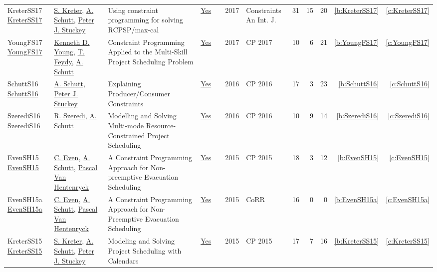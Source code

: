{\begin{longtable}{>{\raggedright\arraybackslash}p{3cm}>{\raggedright\arraybackslash}p{6cm}>{\raggedright\arraybackslash}p{6.5cm}rrrp{2.5cm}rrrrr}
KreterSS17 \href{https://doi.org/10.1007/s10601-016-9266-6}{KreterSS17} & \hyperref[auth:a124]{S. Kreter}, \hyperref[auth:a125]{A. Schutt}, \hyperref[auth:a126]{Peter J. Stuckey} & Using constraint programming for solving RCPSP/max-cal & \href{works/KreterSS17.pdf}{Yes} & \cite{KreterSS17} & 2017 & Constraints An Int. J. & 31 & 15 & 20 & \ref{b:KreterSS17} & \ref{c:KreterSS17}\\
YoungFS17 \href{https://doi.org/10.1007/978-3-319-66158-2\_20}{YoungFS17} & \hyperref[auth:a194]{Kenneth D. Young}, \hyperref[auth:a155]{T. Feydy}, \hyperref[auth:a125]{A. Schutt} & Constraint Programming Applied to the Multi-Skill Project Scheduling Problem & \href{works/YoungFS17.pdf}{Yes} & \cite{YoungFS17} & 2017 & CP 2017 & 10 & 6 & 21 & \ref{b:YoungFS17} & \ref{c:YoungFS17}\\
SchuttS16 \href{https://doi.org/10.1007/978-3-319-44953-1\_28}{SchuttS16} & \hyperref[auth:a125]{A. Schutt}, \hyperref[auth:a126]{Peter J. Stuckey} & Explaining Producer/Consumer Constraints & \href{works/SchuttS16.pdf}{Yes} & \cite{SchuttS16} & 2016 & CP 2016 & 17 & 3 & 23 & \ref{b:SchuttS16} & \ref{c:SchuttS16}\\
SzerediS16 \href{https://doi.org/10.1007/978-3-319-44953-1\_31}{SzerediS16} & \hyperref[auth:a206]{R. Szeredi}, \hyperref[auth:a125]{A. Schutt} & Modelling and Solving Multi-mode Resource-Constrained Project Scheduling & \href{works/SzerediS16.pdf}{Yes} & \cite{SzerediS16} & 2016 & CP 2016 & 10 & 9 & 14 & \ref{b:SzerediS16} & \ref{c:SzerediS16}\\
EvenSH15 \href{https://doi.org/10.1007/978-3-319-23219-5\_40}{EvenSH15} & \hyperref[auth:a220]{C. Even}, \hyperref[auth:a125]{A. Schutt}, \hyperref[auth:a149]{Pascal Van Hentenryck} & A Constraint Programming Approach for Non-preemptive Evacuation Scheduling & \href{works/EvenSH15.pdf}{Yes} & \cite{EvenSH15} & 2015 & CP 2015 & 18 & 3 & 12 & \ref{b:EvenSH15} & \ref{c:EvenSH15}\\
EvenSH15a \href{http://arxiv.org/abs/1505.02487}{EvenSH15a} & \hyperref[auth:a220]{C. Even}, \hyperref[auth:a125]{A. Schutt}, \hyperref[auth:a149]{Pascal Van Hentenryck} & A Constraint Programming Approach for Non-Preemptive Evacuation Scheduling & \href{works/EvenSH15a.pdf}{Yes} & \cite{EvenSH15a} & 2015 & CoRR & 16 & 0 & 0 & \ref{b:EvenSH15a} & \ref{c:EvenSH15a}\\
KreterSS15 \href{https://doi.org/10.1007/978-3-319-23219-5\_19}{KreterSS15} & \hyperref[auth:a124]{S. Kreter}, \hyperref[auth:a125]{A. Schutt}, \hyperref[auth:a126]{Peter J. Stuckey} & Modeling and Solving Project Scheduling with Calendars & \href{works/KreterSS15.pdf}{Yes} & \cite{KreterSS15} & 2015 & CP 2015 & 17 & 7 & 16 & \ref{b:KreterSS15} & \ref{c:KreterSS15}\\

\end{longtable}}
